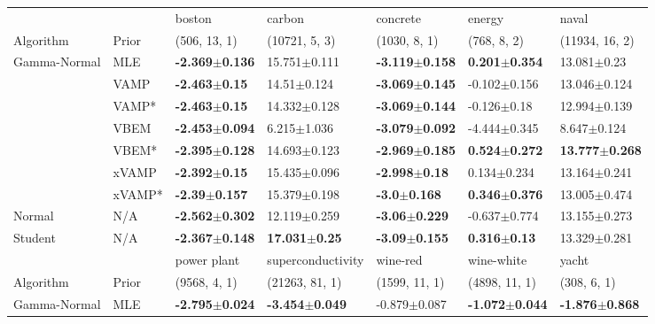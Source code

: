 \begin{tabular}{lllllll}
\toprule
        &     &                     boston &                    carbon &                   concrete &                    energy &                      naval \\
Algorithm & Prior& (506, 13, 1)& (10721, 5, 3)& (1030, 8, 1)& (768, 8, 2)& (11934, 16, 2)\\
\midrule
Gamma-Normal & MLE &  \textbf{-2.369$\pm$0.136} &          15.751$\pm$0.111 &  \textbf{-3.119$\pm$0.158} &  \textbf{0.201$\pm$0.354} &            13.081$\pm$0.23 \\
        & VAMP &   \textbf{-2.463$\pm$0.15} &           14.51$\pm$0.124 &  \textbf{-3.069$\pm$0.145} &          -0.102$\pm$0.156 &           13.046$\pm$0.124 \\
        & VAMP* &   \textbf{-2.463$\pm$0.15} &          14.332$\pm$0.128 &  \textbf{-3.069$\pm$0.144} &           -0.126$\pm$0.18 &           12.994$\pm$0.139 \\
        & VBEM &  \textbf{-2.453$\pm$0.094} &           6.215$\pm$1.036 &  \textbf{-3.079$\pm$0.092} &          -4.444$\pm$0.345 &            8.647$\pm$0.124 \\
        & VBEM* &  \textbf{-2.395$\pm$0.128} &          14.693$\pm$0.123 &  \textbf{-2.969$\pm$0.185} &  \textbf{0.524$\pm$0.272} &  \textbf{13.777$\pm$0.268} \\
        & xVAMP &   \textbf{-2.392$\pm$0.15} &          15.435$\pm$0.096 &   \textbf{-2.998$\pm$0.18} &           0.134$\pm$0.234 &           13.164$\pm$0.241 \\
        & xVAMP* &   \textbf{-2.39$\pm$0.157} &          15.379$\pm$0.198 &    \textbf{-3.0$\pm$0.168} &  \textbf{0.346$\pm$0.376} &           13.005$\pm$0.474 \\
Normal & N/A &  \textbf{-2.562$\pm$0.302} &          12.119$\pm$0.259 &   \textbf{-3.06$\pm$0.229} &          -0.637$\pm$0.774 &           13.155$\pm$0.273 \\
Student & N/A &  \textbf{-2.367$\pm$0.148} &  \textbf{17.031$\pm$0.25} &   \textbf{-3.09$\pm$0.155} &   \textbf{0.316$\pm$0.13} &           13.329$\pm$0.281 \\
\midrule
        &     &                power plant &          superconductivity &                   wine-red &                 wine-white &                      yacht \\
Algorithm & Prior& (9568, 4, 1)& (21263, 81, 1)& (1599, 11, 1)& (4898, 11, 1)& (308, 6, 1)\\
\midrule
Gamma-Normal & MLE &  \textbf{-2.795$\pm$0.024} &  \textbf{-3.454$\pm$0.049} &           -0.879$\pm$0.087 &  \textbf{-1.072$\pm$0.044} &  \textbf{-1.876$\pm$0.868} \\

\end{tabular}
